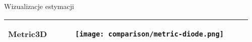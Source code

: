 \begin{easyappendix}{Wizualizacje estymacji}
\begin{table}[H]
{\begin{tabular}{ |m{3cm}|p{3cm}| }
            \hline
            Metric3D &
            \begin{figure}[H]
                \centering
                \texttt{[image: comparison/metric-diode.png]}
            \end{figure} \\
            \hline
            \end{tabular}%
        }
    \end{table}
    \begin{table}[H]
        \centering
        \vspace{0.1cm}
    \end{table}


\end{easyappendix}
